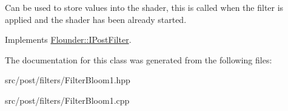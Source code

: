 Can be used to store values into the shader, this is called when the filter is applied and the shader has been already started. 



Implements \hyperlink{class_flounder_1_1_i_post_filter_a20420ec0a9bac67437740552bea9ab74}{Flounder\+::\+I\+Post\+Filter}.



The documentation for this class was generated from the following files\+:\begin{DoxyCompactItemize}
\item 
src/post/filters/Filter\+Bloom1.\+hpp\item 
src/post/filters/Filter\+Bloom1.\+cpp\end{DoxyCompactItemize}
